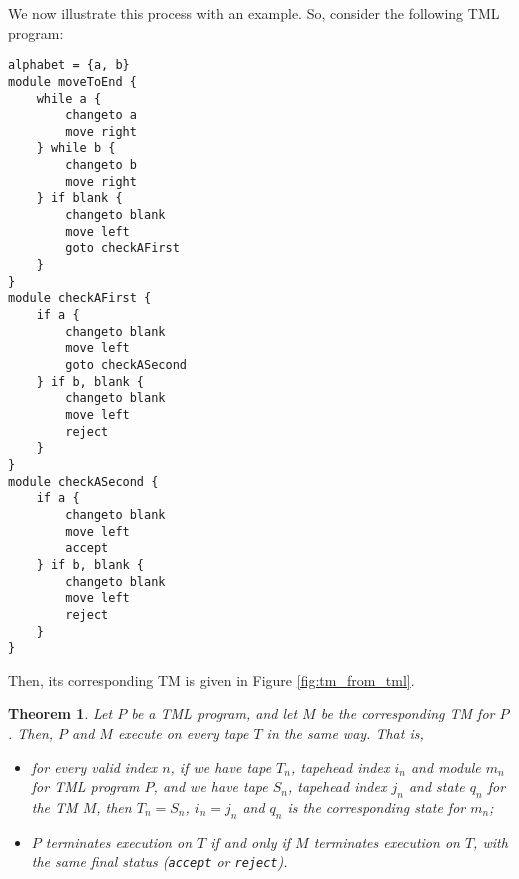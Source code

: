 \documentclass{article}
\newtheorem{theorem}{Theorem}[section]
\begin{document}
    We now illustrate this process with an example. So, consider the following TML program:
\begin{lstlisting}[language=TML]
alphabet = {a, b}
module moveToEnd {
    while a {
        changeto a
        move right
    } while b {
        changeto b
        move right
    } if blank {
        changeto blank
        move left
        goto checkAFirst
    }
}
module checkAFirst {
    if a {
        changeto blank
        move left
        goto checkASecond
    } if b, blank {
        changeto blank
        move left
        reject
    }
}
module checkASecond {
    if a {
        changeto blank
        move left
        accept
    } if b, blank {
        changeto blank
        move left
        reject
    }
}
\end{lstlisting}
    Then, its corresponding TM is given in Figure \ref{fig:tm_from_tml}.
    \begin{theorem}
        Let $P$ be a TML program, and let $M$ be the corresponding TM for $P$. Then, $P$ and $M$ execute on every tape $T$ in the same way. That is,
        \begin{itemize}
            \item for every valid index $n$, if we have tape $T_n$, tapehead index $i_n$ and module $m_n$ for TML program $P$, and we have tape $S_n$, tapehead index $j_n$ and state $q_n$ for the TM $M$, then $T_n = S_n$, $i_n = j_n$ and $q_n$ is the corresponding state for $m_n$;
            \item $P$ terminates execution on $T$ if and only if $M$ terminates execution on $T$, with the same final status (\texttt{accept} or \texttt{reject}).
        \end{itemize}
    \end{theorem}
\end{document}
